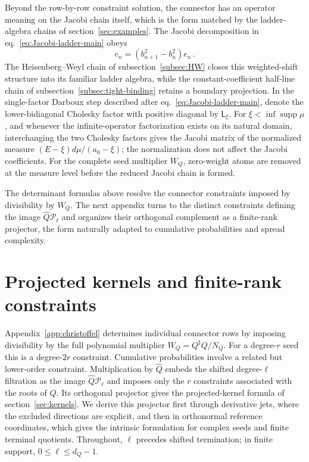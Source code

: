 \documentclass[a4paper,11pt]{article}
\def\dd{d}%
\theoremstyle{definition}
\theoremstyle{remark}
\newcommand{\dd}{\mathrm d}
\newcommand{\cP}{\mathcal P}
\newcommand{\supp}{\operatorname{supp}}
\newcommand{\Qhat}{\widehat Q}
\newcommand{\Qsh}{Q^{\sharp}}
\begin{document}
Beyond the row-by-row constraint solution, the connector has an operator meaning on the Jacobi chain itself, which is the form matched by the ladder-algebra chains of section~\ref{sec:examples}. The Jacobi decomposition in eq.~\eqref{eq:Jacobi-ladder-main} obeys
\begin{equation}
   [\mathsf B_-,\mathsf B_+]e_n
   =(b_{n+1}^2-b_n^2)e_n\,.
\end{equation}
The Heisenberg--Weyl chain of subsection~\ref{subsec:HW} closes this weighted-shift structure into its familiar ladder algebra, while the constant-coefficient half-line chain of subsection~\ref{subsec:tight-binding} retains a boundary projection. In the single-factor Darboux step described after eq.~\eqref{eq:Jacobi-ladder-main}, denote the lower-bidiagonal Cholesky factor with positive diagonal by $\mathsf L_\xi$. For $\xi<\inf\supp\mu$, and whenever the infinite-operator factorization exists on its natural domain, interchanging the two Cholesky factors gives the Jacobi matrix of the normalized measure $(E-\xi)\dd\mu/(a_0-\xi)$; the normalization does not affect the Jacobi coefficients. For the complete seed multiplier $W_Q$, zero-weight atoms are removed at the measure level before the reduced Jacobi chain is formed.

The determinant formulas above resolve the connector constraints imposed
by divisibility by $W_Q$.  The next appendix turns to the distinct
constraints defining the image $\Qhat\cP_\ell$ and organizes their
orthogonal complement as a finite-rank projector, the form naturally
adapted to cumulative probabilities and spread complexity.

\section{Projected kernels and finite-rank constraints}
\label{app:projected-kernel}

Appendix~\ref{app:christoffel} determines individual connector rows by
imposing divisibility by the full polynomial multiplier
$W_Q=\Qsh Q/N_Q$.  For a degree-$r$ seed this is a degree-$2r$ constraint.
Cumulative probabilities involve a related but
lower-order constraint.  Multiplication by $\Qhat$ embeds the shifted
degree-$\ell$ filtration as the image $\Qhat\cP_\ell$ and imposes only the $r$ constraints associated with the roots of $Q$. Its
orthogonal projector gives the projected-kernel formula of
section~\ref{sec:kernels}.  We derive this projector first through
derivative jets, where the excluded directions are explicit, and then
in orthonormal reference coordinates, which gives the intrinsic
formulation for complex seeds and finite terminal quotients.  Throughout,
$\ell$ precedes shifted termination; in finite support,
$0\le\ell\le d_Q-1$.
\end{document}
